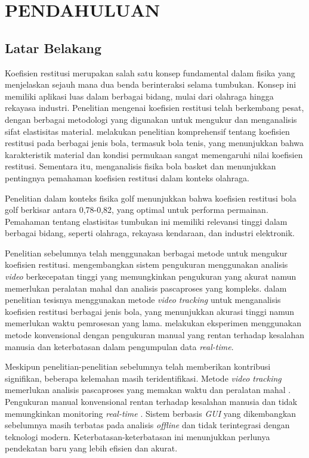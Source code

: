 \chapter{PENDAHULUAN}
\setcounter{page}{1}
\section{Latar Belakang}\label{sec:latar}
 Koefisien restitusi merupakan salah satu konsep fundamental dalam fisika yang menjelaskan sejauh mana dua benda berinteraksi selama tumbukan. Konsep ini memiliki aplikasi luas dalam berbagai bidang, mulai dari olahraga hingga rekayasa industri. Penelitian mengenai koefisien restitusi telah berkembang pesat, dengan berbagai metodologi yang digunakan untuk mengukur dan menganalisis sifat elastisitas material. \citep{cross2002coefficient} melakukan penelitian komprehensif tentang koefisien restitusi pada berbagai jenis bola, termasuk bola tenis, yang menunjukkan bahwa karakteristik material dan kondisi permukaan sangat memengaruhi nilai koefisien restitusi. Sementara itu, \citep{brancazio1981physics} menganalisis fisika bola basket dan menunjukkan pentingnya pemahaman koefisien restitusi dalam konteks olahraga.

Penelitian \citep{penner200200physics} dalam konteks fisika golf menunjukkan bahwa koefisien restitusi bola golf berkisar antara 0,78-0,82, yang optimal untuk performa permainan. Pemahaman tentang elastisitas tumbukan ini memiliki relevansi tinggi dalam berbagai bidang, seperti olahraga, rekayasa kendaraan, dan industri elektronik.

 Penelitian sebelumnya telah menggunakan berbagai metode untuk mengukur koefisien restitusi. \citep{meyer2020coefficient} mengembangkan sistem pengukuran menggunakan analisis \textit{video} berkecepatan tinggi yang memungkinkan pengukuran yang akurat namun memerlukan peralatan mahal dan analisis pascaproses yang kompleks. \citep{hartono2019analisis} dalam penelitian tesisnya menggunakan metode \textit{video tracking} untuk menganalisis koefisien restitusi berbagai jenis bola, yang menunjukkan akurasi tinggi namun memerlukan waktu pemrosesan yang lama. \citep{smith2018experimental} melakukan eksperimen menggunakan metode konvensional dengan pengukuran manual yang rentan terhadap kesalahan manusia dan keterbatasan dalam pengumpulan data \textit{real-time}.

 Meskipun penelitian-penelitian sebelumnya telah memberikan kontribusi signifikan, beberapa kelemahan masih teridentifikasi. Metode \textit{video tracking} memerlukan analisis pascaproses yang memakan waktu dan peralatan mahal \citep{meyer2020coefficient}. Pengukuran manual konvensional rentan terhadap kesalahan manusia dan tidak memungkinkan monitoring \textit{real-time} \citep{smith2018experimental}. Sistem berbasis \textit{GUI} yang dikembangkan sebelumnya masih terbatas pada analisis \textit{offline} dan tidak terintegrasi dengan teknologi modern. Keterbatasan-keterbatasan ini menunjukkan perlunya pendekatan baru yang lebih efisien dan akurat.


